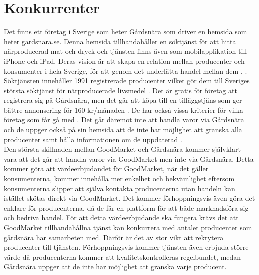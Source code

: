 \documentclass[10pt,a4paper,oneside]{article}
\begin{document}
\section{Konkurrenter}
Det finns ett företag i Sverige som heter Gårdsnära som driver en hemsida som heter gardsnara.se. Denna hemsida tillhandahåller en söktjänst för att hitta närproducerad mat och dryck och tjänsten finns även som mobilapplikation till iPhone och iPad. Deras vision är att skapa en relation mellan producenter och konsumenter i hela Sverige, för att genom det underlätta handel mellan dem \cite{Gårdsnära2}, \cite{Gårdsnära3}. Söktjänsten innehåller 1991 registrerade producenter vilket gör dem till Sveriges största söktjänst för närproducerade livsmedel \cite{Gårdsnära4}. Det är gratis för företag att registrera sig på Gårdsnära, men det går att köpa till en tilläggstjäns som ger bättre annonsering för 160 kr/månaden \cite{Gårdsnära5}. De har också vissa kriterier för vilka företag som får gå med \cite{Gårdsnära1}. Det går däremot inte att handla varor via Gårdsnära och de uppger också på sin hemsida att de inte har möjlighet att granska alla producenter samt hålla informationen om de uppdaterad \cite{Gårdsnära2}.\\

Den största skillnaden mellan GoodMarket och Gårdsnära kommer självklart vara att det går att handla varor via GoodMarket men inte via Gårdsnära. Detta kommer göra att värdeerbjudandet för GoodMarket, när det gäller konsumenterna, kommer innehålla mer enkelhet och bekvämlighet eftersom konsumenterna slipper att själva kontakta producenterna utan handeln kan istället skötas direkt via GoodMarket. Det kommer förhoppningsvis även göra det enklare för producenterna, då de får en plattform för att både marknadsföra sig och bedriva handel. För att detta värdeerbjudande ska fungera krävs det att GoodMarket tillhandahållna tjänst kan konkurrera med antalet producenter som gårdsnära har samarbeten med. Därför är det av stor vikt att rekrytera producenter till tjänsten. Förhoppningsvis kommer tjänsten även erbjuda större värde då producenterna kommer att kvalitetskontrolleras regelbundet, medan Gårdsnära uppger att de inte har möjlighet att granska varje producent.\\
\end{document}
